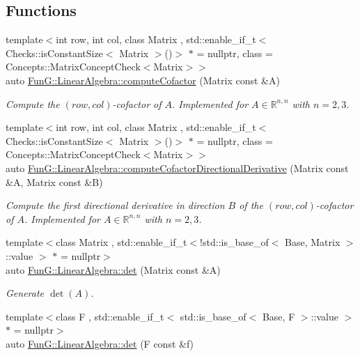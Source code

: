 \subsection*{Functions}
\begin{DoxyCompactItemize}
\item 
{\footnotesize template$<$int row, int col, class Matrix , std\-::enable\-\_\-if\-\_\-t$<$ Checks\-::is\-Constant\-Size$<$ Matrix $>$()$>$ $\ast$  = nullptr, class  = Concepts\-::\-Matrix\-Concept\-Check$<$\-Matrix$>$$>$ }\\auto \hyperlink{group__LinearAlgebraGroup_gace32a0876d4a8333f3bfc564316085ed}{Fun\-G\-::\-Linear\-Algebra\-::compute\-Cofactor} (Matrix const \&A)
\begin{DoxyCompactList}\small\item\em Compute the $(row,col)$-\/cofactor of $ A $. Implemented for $ A\in \mathbb{R}^{n,n} $ with $ n=2,3 $. \end{DoxyCompactList}\item 
{\footnotesize template$<$int row, int col, class Matrix , std\-::enable\-\_\-if\-\_\-t$<$ Checks\-::is\-Constant\-Size$<$ Matrix $>$()$>$ $\ast$  = nullptr, class  = Concepts\-::\-Matrix\-Concept\-Check$<$\-Matrix$>$$>$ }\\auto \hyperlink{group__LinearAlgebraGroup_ga3970ee7fa4d47612427a59cecf56746c}{Fun\-G\-::\-Linear\-Algebra\-::compute\-Cofactor\-Directional\-Derivative} (Matrix const \&A, Matrix const \&B)
\begin{DoxyCompactList}\small\item\em Compute the first directional derivative in direction $ B $ of the $(row,col)$-\/cofactor of $ A $. Implemented for $ A\in \mathbb{R}^{n,n} $ with $ n=2,3 $. \end{DoxyCompactList}\item 
{\footnotesize template$<$class Matrix , std\-::enable\-\_\-if\-\_\-t$<$!std\-::is\-\_\-base\-\_\-of$<$ Base, Matrix $>$\-::value $>$ $\ast$  = nullptr$>$ }\\auto \hyperlink{group__LinearAlgebraGroup_gadb3017b4b2828e25a0784b10396a836f}{Fun\-G\-::\-Linear\-Algebra\-::det} (Matrix const \&A)
\begin{DoxyCompactList}\small\item\em Generate $\det(A)$. \end{DoxyCompactList}\item 
{\footnotesize template$<$class F , std\-::enable\-\_\-if\-\_\-t$<$ std\-::is\-\_\-base\-\_\-of$<$ Base, F $>$\-::value $>$ $\ast$  = nullptr$>$ }\\auto \hyperlink{group__LinearAlgebraGroup_ga552048de67f3412ae0a220b3123db6e5}{Fun\-G\-::\-Linear\-Algebra\-::det} (F const \&f)

\end{DoxyCompactItemize}
